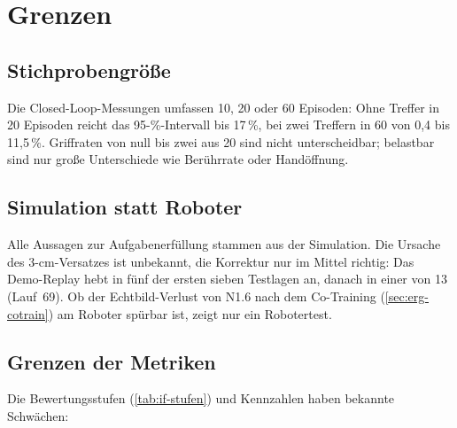 
\chapter{Grenzen}
\label{chap:grenzen}
\label{chap:diskussion}
\label{sec:limitierungen}
\label{sec:validitaet}

\section{Stichprobengröße}
\label{sec:grenzen-stichprobe}

Die Closed-Loop-Messungen umfassen 10, 20 oder 60 Episoden: Ohne Treffer in 20 Episoden reicht
das 95-\%-Intervall bis 17\,\%, bei zwei Treffern in 60 von 0,4 bis 11,5\,\%. Griffraten von null
bis zwei aus 20 sind nicht unterscheidbar; belastbar sind nur große Unterschiede wie
Berührrate oder Handöffnung.

\section{Simulation statt Roboter}
\label{sec:grenzen-simulation}

Alle Aussagen zur Aufgabenerfüllung stammen aus der Simulation. Die Ursache des
3-cm-Versatzes ist unbekannt, die Korrektur nur im Mittel richtig: Das Demo-Replay hebt in fünf
der ersten sieben Testlagen an, danach in einer von 13 (Lauf~69). Ob der Echtbild-Verlust von
N1.6 nach dem Co-Training (\cref{sec:erg-cotrain}) am Roboter spürbar ist, zeigt nur ein Robotertest.

\section{Grenzen der Metriken}
\label{sec:grenzen-metriken}
\label{sec:messartefakte}

Die Bewertungsstufen (\cref{tab:if-stufen}) und Kennzahlen haben bekannte Schwächen:

